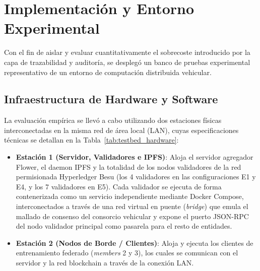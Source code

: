 \section{Implementación y Entorno Experimental}
\label{sec:implementacion}

Con el fin de aislar y evaluar cuantitativamente el sobrecoste introducido por la capa de trazabilidad y auditoría, se desplegó un banco de pruebas experimental representativo de un entorno de computación distribuida vehicular.

\subsection{Infraestructura de Hardware y Software}
La evaluación empírica se llevó a cabo utilizando dos estaciones físicas interconectadas en la misma red de área local (LAN), cuyas especificaciones técnicas se detallan en la Tabla~\ref{tab:testbed_hardware}:
\begin{itemize}
    \item \textbf{Estación 1 (Servidor, Validadores e IPFS)}: Aloja el servidor agregador Flower, el daemon IPFS y la totalidad de los nodos validadores de la red permisionada Hyperledger Besu (los 4 validadores en las configuraciones E1 y E4, y los 7 validadores en E5). Cada validador se ejecuta de forma contenerizada como un servicio independiente mediante Docker Compose, interconectados a través de una red virtual en puente (\textit{bridge}) que emula el mallado de consenso del consorcio vehicular y expone el puerto JSON-RPC del nodo validador principal como pasarela para el resto de entidades.
    \item \textbf{Estación 2 (Nodos de Borde / Clientes)}: Aloja y ejecuta los clientes de entrenamiento federado (\textit{members} 2 y 3), los cuales se comunican con el servidor y la red blockchain a través de la conexión LAN.
\end{itemize}

\begin{table}[H]
\centering
\caption{Especificaciones del banco de pruebas experimental.}
\label{tab:testbed_hardware}
\end{table}

